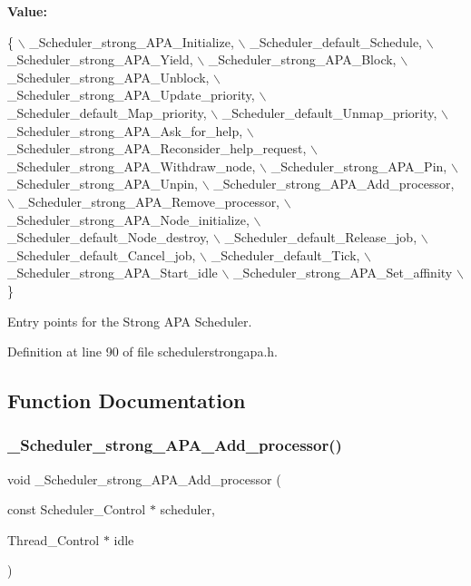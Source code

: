 {\bfseries Value\+:}
\begin{DoxyCode}
\{ \(\backslash\)
    \_Scheduler\_strong\_APA\_Initialize, \(\backslash\)
    \_Scheduler\_default\_Schedule, \(\backslash\)
    \_Scheduler\_strong\_APA\_Yield, \(\backslash\)
    \_Scheduler\_strong\_APA\_Block, \(\backslash\)
    \_Scheduler\_strong\_APA\_Unblock, \(\backslash\)
    \_Scheduler\_strong\_APA\_Update\_priority, \(\backslash\)
    \_Scheduler\_default\_Map\_priority, \(\backslash\)
    \_Scheduler\_default\_Unmap\_priority, \(\backslash\)
    \_Scheduler\_strong\_APA\_Ask\_for\_help, \(\backslash\)
    \_Scheduler\_strong\_APA\_Reconsider\_help\_request, \(\backslash\)
    \_Scheduler\_strong\_APA\_Withdraw\_node, \(\backslash\)
    \_Scheduler\_strong\_APA\_Pin, \(\backslash\)
    \_Scheduler\_strong\_APA\_Unpin, \(\backslash\)
    \_Scheduler\_strong\_APA\_Add\_processor, \(\backslash\)
    \_Scheduler\_strong\_APA\_Remove\_processor, \(\backslash\)
    \_Scheduler\_strong\_APA\_Node\_initialize, \(\backslash\)
    \_Scheduler\_default\_Node\_destroy, \(\backslash\)
    \_Scheduler\_default\_Release\_job, \(\backslash\)
    \_Scheduler\_default\_Cancel\_job, \(\backslash\)
    \_Scheduler\_default\_Tick, \(\backslash\)
    \_Scheduler\_strong\_APA\_Start\_idle \(\backslash\)
    \_Scheduler\_strong\_APA\_Set\_affinity \(\backslash\)
  \}
\end{DoxyCode}


Entry points for the Strong A\+PA Scheduler. 



Definition at line 90 of file schedulerstrongapa.\+h.



\subsection{Function Documentation}
\mbox{\label{group__RTEMSScoreSchedulerStrongAPA_ga6ac09dac24785561fd7c5ee5bbd8f5ca}} 
\subsubsection{\texorpdfstring{\+\_\+\+Scheduler\+\_\+strong\+\_\+\+A\+P\+A\+\_\+\+Add\+\_\+processor()}{\_Scheduler\_strong\_APA\_Add\_processor()}}
{\footnotesize\ttfamily void \+\_\+\+Scheduler\+\_\+strong\+\_\+\+A\+P\+A\+\_\+\+Add\+\_\+processor (\begin{DoxyParamCaption}\item[{const Scheduler\+\_\+\+Control $\ast$}]{scheduler,  }\item[{Thread\+\_\+\+Control $\ast$}]{idle }\end{DoxyParamCaption})}




